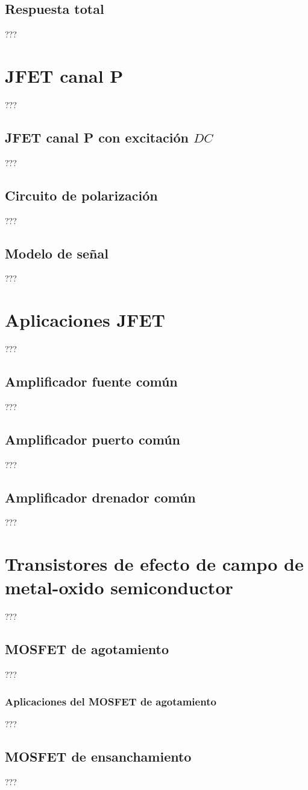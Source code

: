 \subsection{Respuesta total}
???
\section{JFET canal P}
???
\subsection{JFET canal P con excitación $DC$}
???
\subsection{Circuito de polarización}
???
\subsection{Modelo de señal}
???
\section{Aplicaciones JFET}
???
\subsection{Amplificador fuente común}
???
\subsection{Amplificador puerto común}
???
\subsection{Amplificador drenador común}
???
\section{Transistores de efecto de campo de metal-oxido semiconductor}
???
\subsection{MOSFET de agotamiento}
???
\subsubsection{Aplicaciones del MOSFET de agotamiento}
???
\subsection{MOSFET de ensanchamiento}
???
